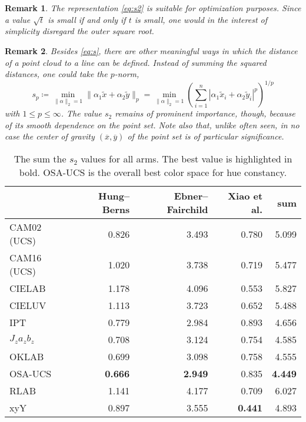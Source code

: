 \documentclass{scrartcl}
\newtheorem*{remark}{Remark}
\theoremstyle{named}
\begin{document}
\begin{remark}
  The representation \eqref{eq:s2} is suitable for optimization purposes. Since a value
  $\sqrt{t}$ is small if and only if $t$ is small, one would in the interest of
  simplicity disregard the outer square root.
\end{remark}

\begin{remark}
Besides \eqref{eq:s}, there are other meaningful ways in which the distance of a point
cloud to a line can be defined. Instead of summing the squared distances, one could take
the $p$-norm,
\[
s_p
  \coloneqq \min_{\|\alpha\|_2=1} \|\alpha_1 \tilde{x} + \alpha_2\tilde{y}\|_p
= \min_{\|\alpha\|_2=1}
  \left(\sum_{i=1}^n |\alpha_1 \tilde{x}_i + \alpha_2 \tilde{y}_i|^p\right)^{1/p}
\]
  with $1\le p \le \infty$.
  The value $s_2$ remains of prominent importance, though, because of its smooth
  dependence on the point set.
  Note also that, unlike often seen, in no case the center of gravity $(\overline{x},
  \overline{y})$ of the point set is of particular significance.
\end{remark}


\begin{table}
  \centering
  \begin{tabular}{lrrrr}
    \toprule
    & Hung--Berns & Ebner--Fairchild & Xiao et al. & sum\\
    \midrule
CAM02 (UCS)   &         0.826  &         3.493  &         0.780  &         5.099\\
CAM16 (UCS)   &         1.020  &         3.738  &         0.719  &         5.477\\
CIELAB        &         1.178  &         4.096  &         0.553  &         5.827\\
CIELUV        &         1.113  &         3.723  &         0.652  &         5.488\\
IPT           &         0.779  &         2.984  &         0.893  &         4.656\\
$J_z a_z b_z$ &         0.708  &         3.124  &         0.754  &         4.585\\
OKLAB         &         0.699  &         3.098  &         0.758  &         4.555\\
OSA-UCS       & \textbf{0.666} & \textbf{2.949} &         0.835  & \textbf{4.449}\\
RLAB          &         1.141  &         4.177  &         0.709  &         6.027\\
xyY           &         0.897  &         3.555  & \textbf{0.441} &         4.893\\
    \bottomrule
  \end{tabular}
  \caption{The sum the $s_2$ values for all arms. The best value is highlighted in bold.
  OSA-UCS is the overall best color space for hue constancy.}
\end{table}




\end{document}
